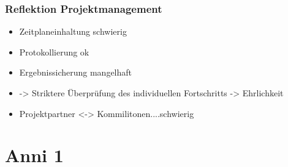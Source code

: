 \documentclass[onecolumn,10pt,titlepage]{article}
\begin{document}
\subsubsection{Reflektion Projektmanagement}
\begin{itemize}
	\item Zeitplaneinhaltung schwierig
	\item Protokollierung ok
	\item Ergebnissicherung mangelhaft
	\item -> Striktere Überprüfung des individuellen Fortschritts -> Ehrlichkeit
	\item Projektpartner <-> Kommilitonen....schwierig
\end{itemize}





%


\appendix
\section{Anni 1}
\end{document}
